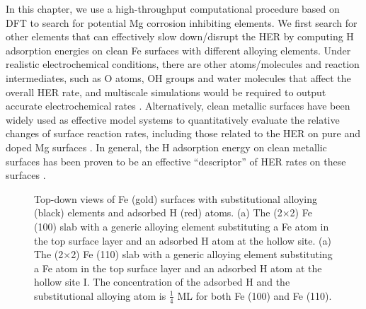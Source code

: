 In this chapter, we use a high-throughput computational procedure based on \ac{DFT} to search for potential Mg corrosion inhibiting elements. We first search for other elements that can effectively slow down/disrupt the \ac{HER} by computing H adsorption energies on clean Fe surfaces with different alloying elements. Under realistic electrochemical conditions, there are other atoms/molecules and reaction intermediates, such as O atoms, OH groups and water molecules that affect the overall \ac{HER} rate, and multiscale simulations would be required to output accurate electrochemical rates \cite{qi2012adsorbate}. Alternatively, clean metallic surfaces have been widely used as effective model systems to quantitatively evaluate the relative changes of surface reaction rates, including those related to the \ac{HER} on pure and doped Mg surfaces \cite{williams2016modeling,pozzo2009hydrogen}. In general, the H adsorption energy on clean metallic surfaces has been proven to be an effective ``descriptor'' of \ac{HER} rates on these surfaces \cite{greeley2006computational}.

\begingroup
\begin{figure}[!ht]
  \centering
  \label{Chap:Mg_H:fig:3a}
  \label{Chap:Mg_H:fig:3b}
\caption[Top-down views of Fe surfaces with substitutional alloying elements and adsorbed H atoms]{Top-down views of Fe (gold) surfaces with substitutional alloying (black) elements and adsorbed H (red) atoms. (a) The (2$\times$2) Fe (100) slab with a generic alloying element substituting a Fe atom in the top surface layer and an adsorbed H atom at the hollow site. (a) The (2$\times$2) Fe (110) slab with a generic alloying element substituting a Fe atom in the top surface layer and an adsorbed H atom at the hollow site I. The concentration of the adsorbed H and the substitutional alloying atom is $\frac{1}{4}$ \ac{ML} for both Fe (100) and Fe (110).}
  \label{Chap:Mg_H:fig3}
\end{figure}
\endgroup